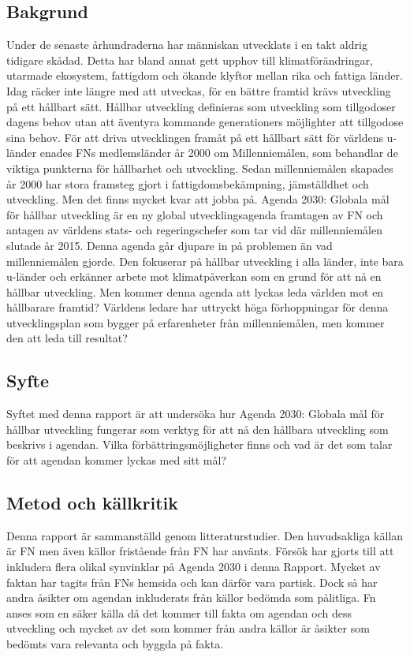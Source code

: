 \documentclass{report}
\begin{document}
\subsection{Bakgrund}
Under de senaste århundraderna har människan utvecklats i en takt aldrig tidigare skådad. Detta har bland annat gett upphov till klimatförändringar, utarmade ekosystem, fattigdom och ökande klyftor mellan rika och fattiga länder.\cite{webWWF} Idag räcker inte längre med att utveckas, för en bättre framtid krävs utveckling på ett hållbart sätt. Hållbar utveckling definieras som utveckling som tillgodoser dagens behov utan att äventyra kommande generationers möjlighter att tillgodose sina behov.\cite{web2030agenda}
För att driva utvecklingen framåt på ett hållbart sätt för världens u-länder enades FNs medlemsländer år 2000 om Millenniemålen, som behandlar de viktiga punkterna för hållbarhet och utveckling.  Sedan millenniemålen skapades år 2000 har stora framsteg gjort i fattigdomsbekämpning, jämställdhet och utveckling. Men det finns mycket kvar att jobba på. \cite{webEuropeanComission}
Agenda 2030: Globala mål för hållbar utveckling är en ny global utvecklingsagenda framtagen av FN och antagen av världens stats- och regeringschefer som tar vid där millenniemålen slutade år 2015. Denna agenda går djupare in på problemen än vad millenniemålen gjorde. Den fokuserar på hållbar utveckling i alla länder, inte bara u-länder och erkänner arbete mot klimatpåverkan som en grund för att nå en hållbar utveckling. Men kommer denna agenda att lyckas leda världen mot en hållbarare framtid? Världens ledare har uttryckt höga förhoppningar för denna utvecklingsplan som bygger på erfarenheter från millenniemålen, men kommer den att leda till resultat?

\subsection{Syfte}
Syftet med denna rapport är att undersöka hur Agenda 2030: Globala mål för hållbar utveckling fungerar som verktyg för att nå den hållbara utveckling som beskrivs i agendan. Vilka förbättringsmöjligheter finns och vad är det som talar för att agendan kommer lyckas med sitt mål? 

\subsection{Metod och källkritik}
Denna rapport är sammanställd genom litteraturstudier. Den huvudsakliga källan är FN men även källor fristående från FN har använts. Försök har gjorts till att inkludera flera olikal synvinklar på Agenda 2030 i denna Rapport. Mycket av faktan har tagits från FNs hemsida och kan därför vara partisk. Dock så har andra åsikter om agendan inkluderats från källor bedömda som pålitliga. Fn anses som en säker källa då det kommer till fakta om agendan och dess utveckling och mycket av det som kommer från andra källor är åsikter som bedömts vara relevanta och byggda på fakta. 
\end{document}
